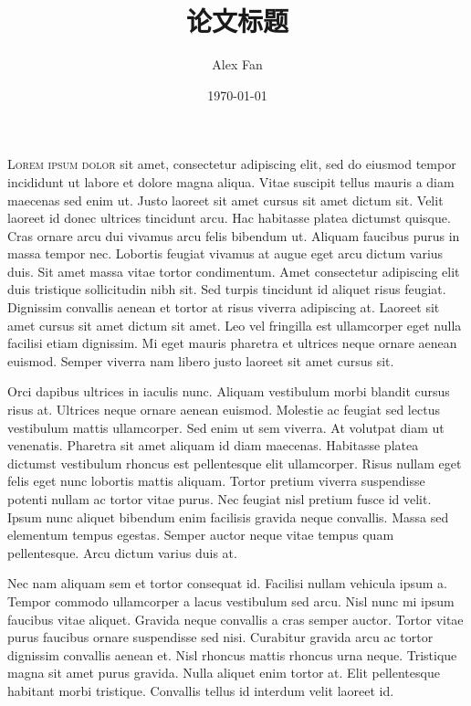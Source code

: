 \documentclass[a4paper,12pt,oneside]{article}
\title{论文标题}
\author{Alex Fan}
\date{\today}
\begin{document}
\lettrine[lines=3,nindent=0em]{L}{orem ipsum dolor} sit amet, consectetur adipiscing elit, sed do eiusmod tempor incididunt ut labore et dolore magna aliqua. Vitae suscipit tellus mauris a diam maecenas sed enim ut. Justo laoreet sit amet cursus sit amet dictum sit. Velit laoreet id donec ultrices tincidunt arcu. Hac habitasse platea dictumst quisque. Cras ornare arcu dui vivamus arcu felis bibendum ut. Aliquam faucibus purus in massa tempor nec. Lobortis feugiat vivamus at augue eget arcu dictum varius duis. Sit amet massa vitae tortor condimentum. Amet consectetur adipiscing elit duis tristique sollicitudin nibh sit. Sed turpis tincidunt id aliquet risus feugiat. Dignissim convallis aenean et tortor at risus viverra adipiscing at. Laoreet sit amet cursus sit amet dictum sit amet. Leo vel fringilla est ullamcorper eget nulla facilisi etiam dignissim. Mi eget mauris pharetra et ultrices neque ornare aenean euismod. Semper viverra nam libero justo laoreet sit amet cursus sit.

Orci dapibus ultrices in iaculis nunc. Aliquam vestibulum morbi blandit cursus risus at. Ultrices neque ornare aenean euismod. Molestie ac feugiat sed lectus vestibulum mattis ullamcorper. Sed enim ut sem viverra. At volutpat diam ut venenatis. Pharetra sit amet aliquam id diam maecenas. Habitasse platea dictumst vestibulum rhoncus est pellentesque elit ullamcorper. Risus nullam eget felis eget nunc lobortis mattis aliquam. Tortor pretium viverra suspendisse potenti nullam ac tortor vitae purus. Nec feugiat nisl pretium fusce id velit. Ipsum nunc aliquet bibendum enim facilisis gravida neque convallis. Massa sed elementum tempus egestas. Semper auctor neque vitae tempus quam pellentesque. Arcu dictum varius duis at.

Nec nam aliquam sem et tortor consequat id. Facilisi nullam vehicula ipsum a. Tempor commodo ullamcorper a lacus vestibulum sed arcu. Nisl nunc mi ipsum faucibus vitae aliquet. Gravida neque convallis a cras semper auctor. Tortor vitae purus faucibus ornare suspendisse sed nisi. Curabitur gravida arcu ac tortor dignissim convallis aenean et. Nisl rhoncus mattis rhoncus urna neque. Tristique magna sit amet purus gravida. Nulla aliquet enim tortor at. Elit pellentesque habitant morbi tristique. Convallis tellus id interdum velit laoreet id.
\end{document}

